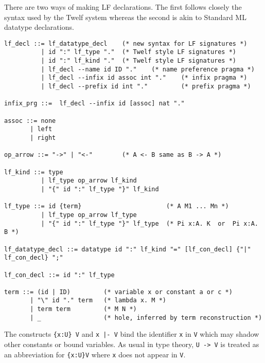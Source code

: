 \documentclass[11pt]{article}
\begin{document}
There are two ways of making LF declarations. The first follows closely the syntax used by the Twelf system whereas the second is akin to Standard ML datatype declarations.

\begin{verbatim}
lf_decl ::= lf_datatype_decl    (* new syntax for LF signatures *)
          | id ":" lf_type "."  (* Twelf style LF signatures *)
          | id ":" lf_kind "."  (* Twelf style LF signatures *)
          | lf_decl --name id ID "."    (* name preference pragma *)
          | lf_decl --infix id assoc int "."    (* infix pragma *)
          | lf_decl --prefix id int "."         (* prefix pragma *)

infix_prg ::=  lf_decl --infix id [assoc] nat "."

assoc ::= none
	   | left
	   | right 

op_arrow ::= "->" | "<-"        (* A <- B same as B -> A *)

lf_kind ::= type
          | lf_type op_arrow lf_kind
          | "{" id ":" lf_type "}" lf_kind

lf_type ::= id {term}                       (* A M1 ... Mn *)
          | lf_type op_arrow lf_type
          | "{" id ":" lf_type "}" lf_type  (* Pi x:A. K  or  Pi x:A. B *)

lf_datatype_decl ::= datatype id ":" lf_kind "=" [lf_con_decl] {"|" lf_con_decl} ";"

lf_con_decl ::= id ":" lf_type

term ::= (id | ID)         (* variable x or constant a or c *)
       | "\" id "." term   (* lambda x. M *)
       | term term         (* M N *)
       | _                 (* hole, inferred by term reconstruction *)
\end{verbatim}
The constructs \texttt{\{x:U\} V} and \texttt{x |- V} bind the identifier \texttt{x} in \texttt{V} which may shadow other constants or bound variables. As usual in type theory, \texttt{U -> V} is treated as an abbreviation for \texttt{\{x:U\}V} where \texttt{x} does not appear in \texttt{V}.
\end{document}
